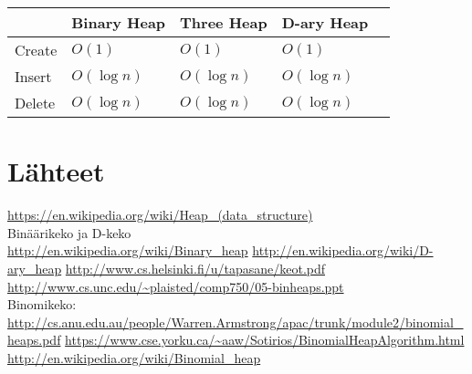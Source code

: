 \documentclass[a4paper,12pt]{article}
\begin{document}
\begin{tabular}{|l|l|l|l|l|}
\hline
&Binary Heap & Three Heap & D-ary Heap \\\hline
Create & $O (1)$ & $O (1)$ & $O (1)$\\\hline
Insert & $O (\log n)$ & $O (\log n)$ & $O (\log n)$\\\hline
Delete  & $O (\log n)$ & $O (\log n)$ & $O (\log n)$\\\hline

\end{tabular}


\section{Lähteet}
\url{https://en.wikipedia.org/wiki/Heap_(data_structure)}
\\Binäärikeko ja D-keko\\
\url{http://en.wikipedia.org/wiki/Binary_heap}
\url{http://en.wikipedia.org/wiki/D-ary_heap}
\url{http://www.cs.helsinki.fi/u/tapasane/keot.pdf}
\url{http://www.cs.unc.edu/~plaisted/comp750/05-binheaps.ppt}
\\Binomikeko:\\
\url{http://cs.anu.edu.au/people/Warren.Armstrong/apac/trunk/module2/binomial_heaps.pdf}
\url{https://www.cse.yorku.ca/~aaw/Sotirios/BinomialHeapAlgorithm.html}
\url{http://en.wikipedia.org/wiki/Binomial_heap}
\url{}
\end{document}
